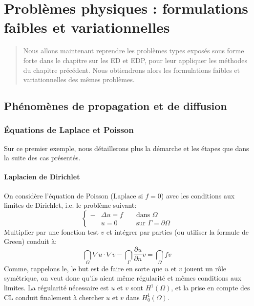 \chapter{Problèmes physiques : formulations faibles et variationnelles}
\begin{abstract}
Nous allons maintenant reprendre les problèmes types exposés sous forme
forte dans le chapitre sur les ED et EDP, pour leur appliquer les méthodes
du chapitre précédent.
Nous obtiendrons alors les formulations faibles et variationnelles des mêmes problèmes.
%
\end{abstract}

\medskip
\section{Phénomènes de propagation et de diffusion}
\medskip
\subsection{Équations de Laplace et Poisson}

Sur ce premier exemple, nous détaillerons plus la démarche et les étapes que dans
la suite des cas présentés.

\medskip
\subsubsection{Laplacien de Dirichlet}
On considère l'équation de Poisson (Laplace si $f=0$) avec les conditions aux limites de Dirichlet,
i.e. le problème suivant:
\begin{equation}\left\{\begin{aligned}
-&\Delta u=f &&\text{ dans } \Omega\\
&u=0 &&\text{ sur } \Gamma=\partial\Omega
\end{aligned}
\right.
\end{equation}
Multiplier par une fonction test $v$ et intégrer par parties (ou utiliser la formule de Green) conduit à:
\begin{equation}
\dint_\Omega \nabla u\cdot\nabla v -\dint_\Gamma \dfrac{\partial u}{\partial n}v =
\dint_\Omega fv
\end{equation}
Comme, rappelons le, le but est de faire en sorte que $u$ et $v$ jouent un
rôle symétrique, on veut donc qu'ils aient même régularité et mêmes
conditions aux limites. La régularité nécessaire est $u$ et $v$ sont
$H^1(\Omega)$, et la prise en compte des CL conduit finalement à chercher
$u$ et $v$ dans $H^1_0(\Omega)$.

